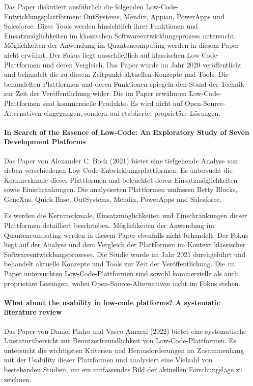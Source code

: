 Das Paper diskutiert ausführlich die folgenden Low-Code-Entwicklungsplattformen: OutSystems, Mendix, Appian, PowerApps und Salesforce. 
Diese Tools werden hinsichtlich ihrer Funktionen und Einsatzmöglichkeiten im klassischen Softwareentwicklungsprozess untersucht.
Möglichkeiten der Anwendung im Quantencomputing werden in diesem Paper nicht erwähnt. Der Fokus liegt ausschließlich auf klassischen 
Low-Code-Plattformen und deren Vergleich.
Das Paper wurde im Jahr 2020 veröffentlicht und behandelt die zu diesem Zeitpunkt aktuellen Konzepte und Tools. Die behandelten 
Plattformen und deren Funktionen spiegeln den Stand der Technik zur Zeit der Veröffentlichung wider.
Die im Paper erwähnten Low-Code-Plattformen sind kommerzielle Produkte. Es wird nicht auf Open-Source-Alternativen 
eingegangen, sondern auf etablierte, proprietäre Lösungen.

\paragraph{In Search of the Essence of Low-Code: An Exploratory Study of Seven Development Platforms}

Das Paper von Alexander C. Bock (2021) \cite{Bock_2021_essence} bietet eine tiefgehende Analyse von sieben verschiedenen Low-Code-Entwicklungsplattformen. 
Es untersucht die Kernmerkmale dieser Plattformen und beleuchtet deren Einsatzmöglichkeiten sowie Einschränkungen. Die analysierten 
Plattformen umfassen Betty Blocks, GeneXus, Quick Base, OutSystems, Mendix, PowerApps und Salesforce.

Es werden die Kernmerkmale, Einsatzmöglichkeiten und Einschränkungen dieser Plattformen detailliert beschrieben. 
Möglichkeiten der Anwendung im Quantencomputing werden in diesem Paper ebenfalls nicht behandelt. 
Der Fokus liegt auf der Analyse und dem Vergleich der Plattformen im Kontext klassischer Softwareentwicklungsprozesse. 
Die Studie wurde im Jahr 2021 durchgeführt und behandelt aktuelle Konzepte und Tools zur Zeit der Veröffentlichung. 
Die im Paper untersuchten Low-Code-Plattformen sind sowohl kommerzielle als auch proprietäre Lösungen, 
wobei Open-Source-Alternativen nicht im Fokus stehen.

\paragraph{What about the usability in low-code platforms? A systematic literature review}

Das Paper von Daniel Pinho und Vasco Amaral (2022) \cite{Pinho_2022} bietet eine systematische Literaturübersicht zur Benutzerfreundlichkeit von 
Low-Code-Plattformen. Es untersucht die wichtigsten Kriterien und Herausforderungen im Zusammenhang mit der Usability 
dieser Plattformen und analysiert eine Vielzahl von bestehenden Studien, um ein umfassendes Bild der aktuellen Forschungslage zu zeichnen.

